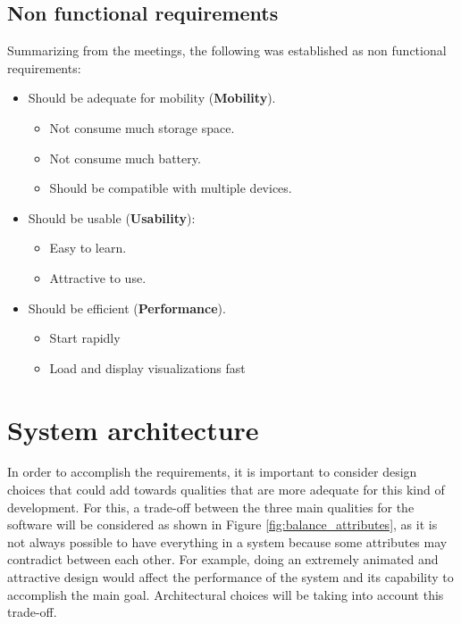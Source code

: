 \subsection{Non functional requirements}

Summarizing from the meetings, the following was established as non functional requirements:

\begin{itemize}
	\item Should be adequate for mobility (\textbf{Mobility}).
	\begin{itemize}
		\item Not consume much storage space.
		\item Not consume much battery.
        \item Should be compatible with multiple devices. 
	\end{itemize}
    \item Should be usable (\textbf{Usability}):
    \begin{itemize}
		\item Easy to learn.
        \item Attractive to use.
	\end{itemize}
    \item Should be efficient (\textbf{Performance}).
    \begin{itemize}
		\item Start rapidly
        \item Load and display visualizations fast
	\end{itemize}
    
\end{itemize}


\section{System architecture}
In order to accomplish the requirements, it is important to consider design choices that could add towards qualities that are more adequate for this kind of development. For this, a trade-off between the three main qualities for the software will be considered as shown in Figure \ref{fig:balance_attributes}, as it is not always possible to have everything in a system because some attributes may contradict between each other. For example, doing an extremely animated and attractive design would affect the performance of the system and its capability to accomplish the main goal. Architectural choices will be taking into account this trade-off.


